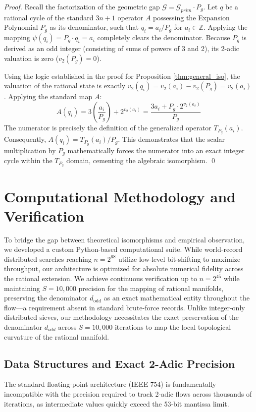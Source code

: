 \documentclass[11pt, a4paper]{article}
\theoremstyle{definition}
\begin{document}
\begin{proof}
Recall the factorization of the geometric gap $\mathcal{G} = \mathcal{G}_{prim} \cdot P_g$. Let $q$ be a rational cycle of the standard $3n+1$ operator $A$ possessing the Expansion Polynomial $P_g$ as its denominator, such that $q_i = a_i / P_g$ for $a_i \in \mathbb{Z}$. Applying the mapping \(\psi(q_i) = P_g \cdot q_i = a_i\) completely clears the denominator. Because $P_g$ is derived as an odd integer (consisting of sums of powers of 3 and 2), its 2-adic valuation is zero ($v_2(P_g) = 0$).

Using the logic established in the proof for Proposition \ref{thm:general_iso}, the valuation of the rational state is exactly $v_2(q_i) = v_2(a_i) - v_2(P_g) = v_2(a_i)$. Applying the standard map $A$:
\begin{equation*}
A(q_i) = 3\left(\frac{a_i}{P_g}\right) + 2^{v_2(a_i)} = \frac{3a_i + P_g \cdot 2^{v_2(a_i)}}{P_g}
\end{equation*}
The numerator is precisely the definition of the generalized operator $T_{P_g}(a_i)$. Consequently, $A(q_i) = T_{P_g}(a_i) / P_g$. This demonstrates that the scalar multiplication by $P_g$ mathematically forces the numerator into an exact integer cycle within the $T_{P_g}$ domain, cementing the algebraic isomorphism. \qed
\end{proof}

\section{Computational Methodology and Verification}

To bridge the gap between theoretical isomorphisms and empirical observation, we developed a custom Python-based computational suite. While world-record distributed searches reaching $n=2^{68}$ utilize low-level bit-shifting to maximize throughput, our architecture is optimized for absolute numerical fidelity across the rational extension. We achieve continuous verification up to $n=2^{45}$ while maintaining $S=10,000$ precision for the mapping of rational manifolds, preserving the denominator $d_{\text{odd}}$ as an exact mathematical entity throughout the flow---a requirement absent in standard brute-force records. Unlike integer-only distributed sieves, our methodology necessitates the exact preservation of the denominator $d_{odd}$ across $S=10,000$ iterations to map the local topological curvature of the rational manifold.

\subsection{Data Structures and Exact 2-Adic Precision}
The standard floating-point architecture (IEEE 754) is fundamentally incompatible with the precision required to track 2-adic flows across thousands of iterations, as intermediate values quickly exceed the 53-bit mantissa limit.
\end{document}
